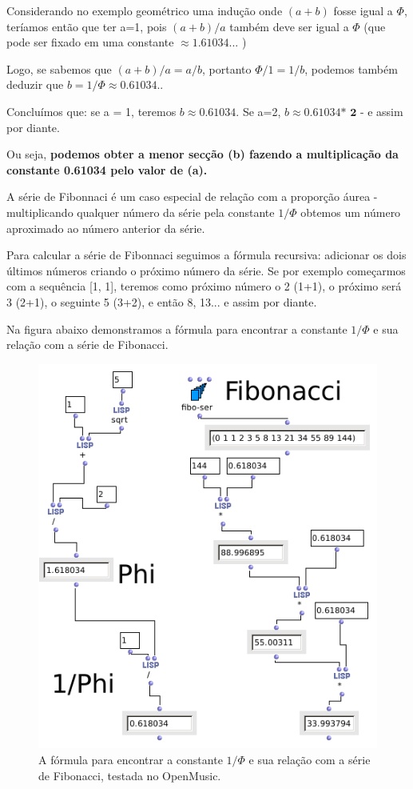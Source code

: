 \documentclass[
	12pt,				%
	openright,			%
	twoside,			%
	a4paper,			%
	english,			%
	french,				%
	spanish,			%
	brazil				%
	]{abntex2}
\begin{document}
Considerando no exemplo geométrico uma indução onde $(a+b)$ fosse igual a $\Phi$, teríamos então que ter a=1, pois $(a+b)/a$ também deve ser igual a $\Phi$ (que pode ser fixado em uma constante  $ \approx 1.61034... $ ) 

Logo, se sabemos que $(a+b)/a = a/b $, portanto $\Phi/1 = 1/b$, podemos também deduzir que $b = 1/\Phi \approx 0.61034.. $ 

Concluímos que: se a = 1, teremos $b \approx 0.61034 $. Se a=2, $b \approx 0.61034 \textbf{* 2} $ - e assim por diante.

Ou seja, \textbf{podemos obter a menor secção (b) fazendo a multiplicação da constante 0.61034 pelo valor de (a).}

A série de Fibonnaci é um caso especial de relação com a proporção áurea - multiplicando qualquer número da série pela constante $1/\Phi$ obtemos um número aproximado ao número anterior da série.

Para calcular a série de Fibonnaci seguimos a fórmula recursiva: adicionar os dois últimos números criando o próximo número da série. Se por exemplo começarmos com a sequência [1, 1], teremos como próximo número o 2 (1+1), o próximo será 3 (2+1), o seguinte 5 (3+2), e então 8, 13... e assim por diante. 

Na figura abaixo demonstramos a fórmula para encontrar a constante $1/\Phi$ e sua relação com a série de Fibonacci.

\begin{figure}[!h]
	\caption{\label{fig_grafico}A fórmula para encontrar a constante $1/\Phi$ e sua relação com a série de Fibonacci, testada no OpenMusic. }
	\begin{center}
	    \includegraphics[scale=0.45]{OM_settheory/aurea.png}
	\end{center}
\end{figure}	
\end{document}
